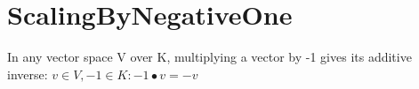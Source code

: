 \section{ScalingByNegativeOne}

\begin{theorem}
  \label{theorem : neg_one_smul}
  \leanok
  In any vector space V over K, multiplying a vector by -1 gives its additive inverse: $v \in V, -1 \in K : -1 \bullet v = -v$
\end{theorem}
